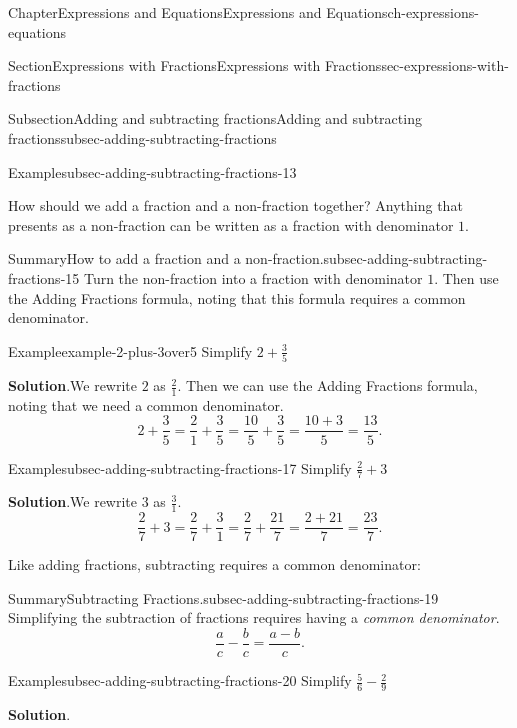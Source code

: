 \documentclass[twoside,11pt,]{book}
\newcommand{\blocktitlefont}{\relax}
\numberwithin{equation}{chapter}
\begin{document}
\begin{chapterptx}{Chapter}{Expressions and Equations}{}{Expressions and Equations}{}{}{ch-expressions-equations}
\begin{sectionptx}{Section}{Expressions with Fractions}{}{Expressions with Fractions}{}{}{sec-expressions-with-fractions}
\begin{subsectionptx}{Subsection}{Adding and subtracting fractions}{}{Adding and subtracting fractions}{}{}{subsec-adding-subtracting-fractions}
\begin{example}{Example}{}{subsec-adding-subtracting-fractions-13}
\begin{equation*}
\end{equation*}
%
\end{example}
How should we add a fraction and a non-fraction together? Anything that presents as a non-fraction can be written as a fraction with denominator \(1\).%
\begin{assemblage}{Summary}{How to add a fraction and a non-fraction.}{subsec-adding-subtracting-fractions-15}%
Turn the non-fraction into a fraction with denominator \(1\). Then use the Adding Fractions formula, noting that this formula requires a common denominator.%
\end{assemblage}
\begin{example}{Example}{}{example-2-plus-3over5}%
Simplify \(2 + \frac{3}{5}\)%
\par\smallskip%
\noindent\textbf{\blocktitlefont Solution}.\hypertarget{example-2-plus-3over5-2}{}\quad{}We rewrite \(2\) as \(\frac{2}{1}\). Then we can use the Adding Fractions formula, noting that we need a common denominator.%
\begin{equation*}
2 + \frac{3}{5} = \frac{2}{1} + \frac{3}{5} = \frac{10}{5} + \frac{3}{5} = \frac{10+3}{5} = \frac{13}{5}.
\end{equation*}
%
\end{example}
\begin{example}{Example}{}{subsec-adding-subtracting-fractions-17}%
Simplify \(\frac27 + 3\)%
\par\smallskip%
\noindent\textbf{\blocktitlefont Solution}.\hypertarget{subsec-adding-subtracting-fractions-17-2}{}\quad{}We rewrite \(3\) as \(\frac31\).%
\begin{equation*}
\frac27 + 3 = \frac27 + \frac31 = \frac27 + \frac{21}{7} = \frac{2+21}{7} = \frac{23}{7}.
\end{equation*}
%
\end{example}
Like adding fractions, subtracting requires a common denominator:%
\begin{assemblage}{Summary}{Subtracting Fractions.}{subsec-adding-subtracting-fractions-19}%
Simplifying the subtraction of fractions requires having a \emph{common denominator}.%
\begin{equation*}
\frac{a}{c}-\frac{b}{c} = \frac{a - b}{c}.
\end{equation*}
%
\end{assemblage}
\begin{example}{Example}{}{subsec-adding-subtracting-fractions-20}%
Simplify \(\frac56 - \frac29\)%
\par\smallskip%
\noindent\textbf{\blocktitlefont Solution}.\hypertarget{subsec-adding-subtracting-fractions-20-2}{}\quad{}%

\end{example}
\end{subsectionptx}
\end{sectionptx}
\end{chapterptx}
\end{document}
